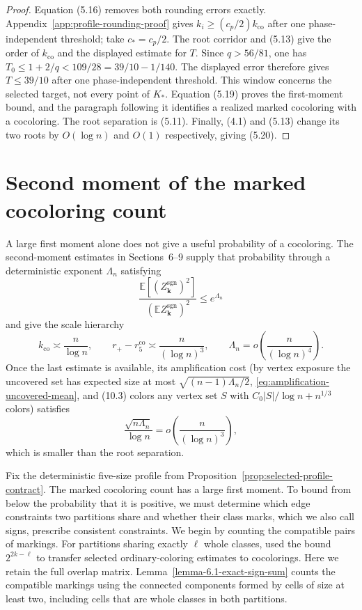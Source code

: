 \documentclass[a4paper,10pt,reqno]{amsart}
\numberwithin{equation}{section}
\theoremstyle{plain}
\theoremstyle{remark}
\begin{document}
\begin{proof}
Equation (5.16) removes both rounding errors exactly.
Appendix~\ref{app:profile-rounding-proof} gives
$k_i\ge(c_p/2)k_{\mathrm{co}}$ after one phase-independent threshold;
take $c_*=c_p/2$. The root corridor and (5.13)
give the order of $k_{\mathrm{co}}$ and the displayed estimate for $T$.
Since $q>56/81$, one has
$T_0\le1+2/q<109/28=39/10-1/140$. The displayed error therefore gives
$T\le39/10$ after one phase-independent threshold. This window concerns
the selected target, not every point of $K_*$. Equation (5.19) proves the first-moment
bound, and the paragraph following it identifies a realized marked cocoloring
with a cocoloring. The root separation is (5.11). Finally, (4.1) and (5.13)
change its two roots by $O(\log n)$ and $O(1)$ respectively, giving (5.20).
\end{proof}

\section{Second moment of the marked cocoloring count}\label{exact-signed-second-moment-representation}

A large first moment alone does not give a useful probability of a
cocoloring. The second-moment estimates in Sections~6--9 supply that
probability through a deterministic exponent $\Lambda_n$ satisfying
\[
  \frac{\mathbb E[(Z_{\mathbf k}^{\mathrm{sgn}})^2]}
       {(\mathbb E Z_{\mathbf k}^{\mathrm{sgn}})^2}
  \le e^{\Lambda_n}
\]
and give the scale hierarchy
\[
  k_{\mathrm{co}}\asymp\frac n{\log n},\qquad
  r_+-r_5^{\mathrm{co}}\asymp\frac n{(\log n)^3},\qquad
  \Lambda_n=o\!\left(\frac n{(\log n)^4}\right).
\]
Once the last estimate is available, its amplification cost (by vertex
exposure the uncovered set has expected size at most
$\sqrt{(n-1)\Lambda_n/2}$, \eqref{eq:amplification-uncovered-mean}, and
(10.3) colors any vertex set $S$ with $C_0|S|/\log n+n^{1/3}$ colors)
satisfies
\[
  \frac{\sqrt{n\Lambda_n}}{\log n}
  =o\!\left(\frac n{(\log n)^3}\right),
\]
which is smaller than the root separation.

Fix the deterministic five-size profile from
Proposition~\ref{prop:selected-profile-contract}. The marked cocoloring count
has a large first moment. To bound from below the probability that it is
positive, we must determine which edge constraints two partitions share and
whether their class marks, which we also call signs, prescribe consistent
constraints. We begin by counting the compatible pairs of markings. For partitions sharing exactly \(\ell\) whole classes,
\citet[Proposition~6]{heckel-2025-difference} used the bound
\(2^{2k-\ell}\) to transfer selected ordinary-coloring estimates to
cocolorings. Here we retain the full overlap matrix. Lemma~\ref{lemma-6.1-exact-sign-sum} counts the
compatible markings using the connected components formed by cells of size
at least two, including cells that are whole classes in both partitions.
\end{document}
